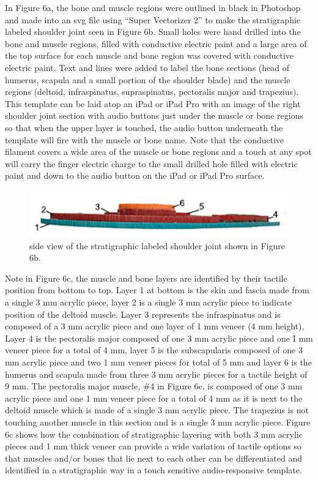 \documentclass[11.5pt]{sig-alternate} %
\begin{document}
\begin{large}
\newpage
In Figure 6a, the bone and muscle regions were outlined in black in Photoshop and made into an svg file using “Super Vectorizer 2” to make the stratigraphic labeled shoulder joint seen in Figure 6b.  Small holes were hand drilled into the bone and muscle regions, filled with conductive electric paint and a large area of the top surface for each muscle and bone region was covered with conductive electric paint.  Text and lines were added to label the bone sections (head of humerus, scapula and a small portion of the shoulder blade) and the muscle regions (deltoid, infraspinatus, supraspinatus, pectoralis major and trapezius).  This template can be laid atop an iPad or iPad Pro with an image of the right shoulder joint section with audio buttons just under the muscle or bone regions so that when the upper layer is touched, the audio button underneath the template will fire with the muscle or bone name.  Note that the conductive filament covers a wide area of the muscle or bone regions and a touch at any spot will carry the finger electric charge to the small drilled hole filled with electric paint and down to the audio button on the iPad or iPad Pro surface. 

\begin{figure}[h] \ContinuedFloat
    \centering
    \includegraphics[width=1\linewidth]{fig 6c.png}
    \caption{side view of the stratigraphic labeled shoulder joint shown in Figure 6b.}
    
\end{figure}

Note in Figure 6c, the muscle and bone layers are identified by their tactile position from bottom to top.  Layer 1 at bottom is the skin and fascia made from a single 3 mm acrylic piece, layer 2 is a single 3 mm acrylic piece to indicate position of the deltoid muscle.  Layer 3 represents the infraspinatus and is composed of a 3 mm acrylic piece and one layer of 1 mm veneer (4 mm height), Layer 4 is the pectoralis major composed of one 3 mm acrylic piece and one I mm veneer piece for a total of 4 mm,  layer 5 is the subscapularis composed of one 3 mm acrylic piece and two 1 mm veneer pieces for total of 5 mm and layer 6 is the humerus and scapula made from three 3 mm acrylic pieces for a tactile height of 9 mm.  The pectoralis major muscle, \#4 in Figure 6c, is composed of one 3 mm acrylic piece and one 1 mm veneer piece for a total of 4 mm as it is next to the deltoid muscle which is made of a single 3 mm acrylic piece.  The trapezius is not touching another muscle in this section and is a single 3 mm acrylic piece.  Figure 6c shows how the combination of stratigraphic layering with both 3 mm acrylic pieces and 1 mm thick veneer can provide a wide variation of tactile options so that muscles and/or bones that lie next to each other can be differentiated and identified in a stratigraphic way in a touch sensitive audio-responsive template. 


\end{large}
\end{document}

